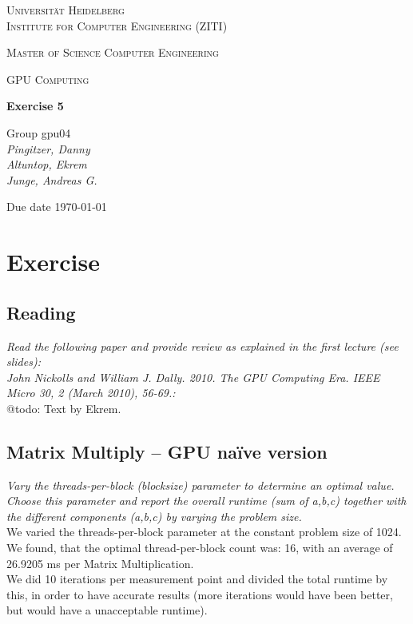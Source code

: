 \documentclass[12pt]{article}
\newcommand{\lecture}{GPU Computing}
\newcommand{\exercise}{Exercise 5}
\newcommand{\groupnumber}{Group gpu04}
\newcommand{\groupmemberslist}{Pingitzer, Danny\\Altuntop, Ekrem\\Junge, Andreas G.}
\newcommand{\duedate}{\today}
\begin{document}
	\begin{titlepage}
		\centering

		{\scshape\LARGE Universität Heidelberg\\Institute for Computer Engineering (ZITI) \par}
		\vspace{1.5cm}
		{\scshape\Large Master of Science Computer Engineering \par}
		\vspace{0.5cm}
		{\scshape\Large \lecture \par}
		\vspace{1.5cm}
		{\huge\bfseries \exercise \par}
		\vspace{2cm}
		{\Large \groupnumber \itshape  \\ \groupmemberslist \par}
		\vfill
		
		
		{\large Due date \duedate \par}
	\end{titlepage}

\setcounter{section}{4}
\section{Exercise}
\subsection{Reading}
\emph{Read the following paper and provide review as explained in the first lecture (see slides):}\\

\noindent\emph{John Nickolls and William J. Dally. 2010. The GPU Computing Era. IEEE Micro 30, 2 (March 2010), 56-69.:}\\

\noindent @todo: Text by Ekrem.


\newpage
\subsection{Matrix Multiply – GPU na\"ive version}
\emph{Vary the threads-per-block (blocksize) parameter to determine an optimal value. Choose this parameter and report the overall runtime (sum of a,b,c) together with the different components (a,b,c) by varying	the problem size.}\\

\noindent We varied the threads-per-block parameter at the constant problem size of 1024. We found, that the optimal thread-per-block count was: 16, with an average of 26.9205 ms per Matrix Multiplication.\\
We did 10 iterations per measurement point and divided the total runtime by this, in order to have accurate results (more iterations would have been better, but would have a unacceptable runtime).\\
\end{document}
